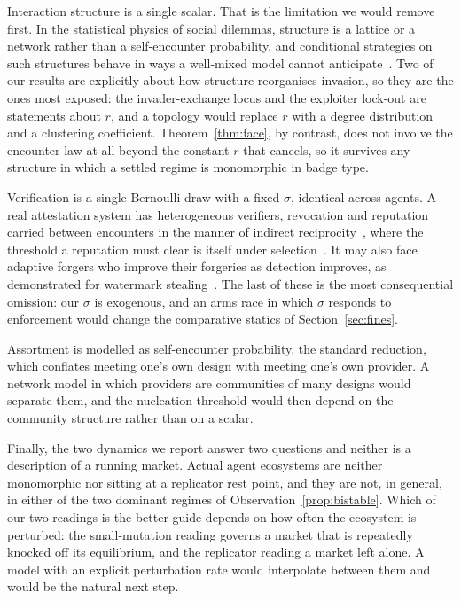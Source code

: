 \documentclass[preprint,12pt]{elsarticle}
\theoremstyle{plain}
\theoremstyle{definition}
\begin{document}
Interaction structure is a single scalar. That is the limitation we would
remove first. In the statistical physics of social dilemmas, structure is a
lattice or a network rather than a self-encounter probability, and conditional
strategies on such structures behave in ways a well-mixed model cannot
anticipate~\citep{szolnoki2012conditional,perc2017statphys}. Two of our results
are explicitly about how structure reorganises invasion, so they are the ones
most exposed: the invader-exchange locus and the exploiter lock-out are
statements about $r$, and a topology would replace $r$ with a degree
distribution and a clustering coefficient. Theorem~\ref{thm:face}, by contrast,
does not involve the encounter law at all beyond the constant $r$ that cancels,
so it survives any structure in which a settled regime is monomorphic in badge
type.

Verification is a single Bernoulli draw with a fixed $\sigma$, identical across
agents. A real attestation system has heterogeneous verifiers, revocation and
reputation carried between encounters in the manner of indirect
reciprocity~\citep{santos2018social}, where the threshold a reputation must
clear is itself under selection~\citep{yue2025reputation}. It may also face
adaptive forgers who
improve their forgeries as detection improves, as demonstrated for watermark
stealing~\citep{jovanovic2024watermarkstealing}. The last of these is the most
consequential omission: our $\sigma$ is exogenous, and an arms race in which
$\sigma$ responds to enforcement would change the comparative statics of
Section~\ref{sec:fines}.

Assortment is modelled as self-encounter probability, the standard reduction,
which conflates meeting one's own design with meeting one's own provider. A
network model in which providers are communities of many designs would separate
them, and the nucleation threshold would then depend on the community structure
rather than on a scalar.

Finally, the two dynamics we report answer two questions and neither is a
description of a running market. Actual agent ecosystems are neither
monomorphic nor sitting at a replicator rest point, and they are not, in
general, in either of the two dominant regimes of
Observation~\ref{prop:bistable}. Which of our two readings is the better guide
depends on how often the ecosystem is perturbed: the small-mutation reading
governs a market that is repeatedly knocked off its equilibrium, and the
replicator reading a market left alone. A model with an explicit perturbation
rate would interpolate between them and would be the natural next step.
\end{document}
